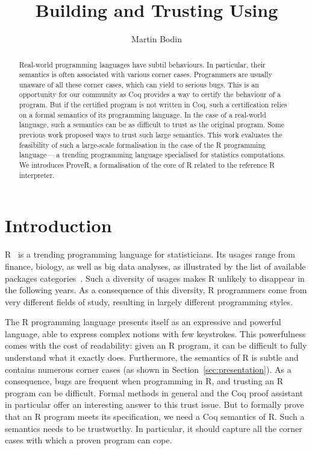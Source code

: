 \documentclass[9pt, sigplan, natbib=false, screen=true]{acmart}
\title{Building and Trusting \R{} Using \Coq{}}
\author{Martin Bodin}
\affiliation{
    \institution{Center of Mathematical Modeling}
    \streetaddress{Beauchef 851}
    \city{Santiago}
    \country{Chile}
}
\newcommand\Coq{Coq}
\newcommand\R{R}
\begin{document}
\begin{abstract}
Real-world programming languages have subtil behaviours.
In particular, their semantics is often associated with
various corner cases.
Programmers are usually unaware of all these corner cases,
which can yield to serious bugs.
This is an opportunity for our community
as \Coq{} provides a way to certify the behaviour of a program.
But if the certified program is not written in \Coq{},
such a certification relies on a formal semantics of its programming language.
In the case of a real-world language, such a semantics
can be as difficult to trust as the original program.
Some previous work proposed ways to trust such large semantics.
This work evaluates the feasibility of such a large-scale formalisation
in the case of the \R{} programming language—%
a trending programming language specialised for statistics computations.
We introduces ProveR, a formalisation of the core of \R{}
related to the reference \R{} interpreter.
\end{abstract}

\maketitle

\section{Introduction}
\label{sec:introduction}

\R{}~\parencite{ihaka1996r, Rwebsite} is a trending
programming language for statisticians.
Its usages range from finance, biology,
as well as big data analyses,
as illustrated by the list of available packages categories~\parencite{rviews}.
Such a diversity of usages makes \R{} unlikely to disappear
in the following years.
As a consequence of this diversity,
\R{} programmers come from very different fields of study,
resulting in largely different programming styles.

The \R{} programming language presents itself
as an expressive and powerful language,
able to express complex notions with few keystrokes.
This powerfulness comes with the cost of readability:
given an \R{} program, it can be difficult to fully
understand what it exactly does.
Furthermore, the semantics of \R{} is subtle
and contains numerous corner cases
(as shown in Section~\ref{sec:presentation}).
%
As a consequence, bugs are frequent when programming in \R{},
and trusting an \R{} program can be difficult.
Formal methods in general and the \Coq{} proof assistant in particular
offer an interesting answer to this trust issue.
But to formally prove that an \R{} program meets its specification,
we need a \Coq{} semantics of \R{}.
Such a semantics needs to be trustworthy.
In particular, it should capture all the corner cases
with which a proven program can cope.
\end{document}
